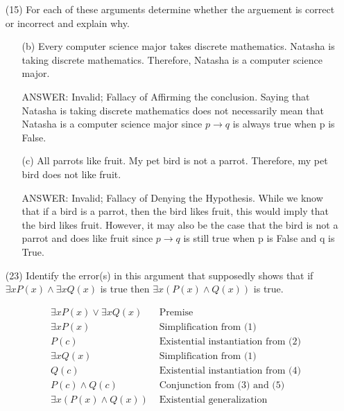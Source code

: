 \documentclass[12pt]{article}
\newcommand\buf{\vspace{0.10in}}
\newenvironment{answer}{\fontfamily{ptm}\selectfont \smaller[1] ANSWER: }{}
\begin{document}
\begin{enumerate}
\vspace{0.20in}



\item[(15)] For each of these arguments determine whether the arguement is correct or incorrect and explain why.
\buf

\begin{enumerate}
	\item[(b)] Every computer science major takes discrete mathematics. Natasha is taking discrete mathematics. Therefore, Natasha is a computer science major.
	
	\begin{answer}
		Invalid; Fallacy of Affirming the conclusion. Saying that Natasha is taking discrete mathematics does not necessarily mean that Natasha is a computer science major since $p \to q$ is always true when p is False.
	\end{answer}

	\item[(c)] All parrots like fruit. My pet bird is not a parrot. Therefore, my pet bird does not like fruit.
	
	\begin{answer}
		Invalid; Fallacy of Denying the Hypothesis. While we know that if a bird is a parrot, then the bird likes fruit, this would imply that the bird likes fruit. However, it may also be the case that the bird is not a parrot and does like fruit since $p \to q$ is still true when p is False and q is True.
	\end{answer}
\end{enumerate}

\vspace{0.20in}

\item[(23)] Identify the error(s) in this argument that supposedly shows that if $\exists x P(x) \wedge \exists x Q(x)$ is true then $\exists x (P(x) \wedge Q(x))$ is true.

\begin{align}
	&\exists x P(x) \vee \exists x Q(x) &\text{ Premise}\\
	&\exists x P(x) &\text{ Simplification from (1)}\\
	&P(c) &\text{ Existential instantiation from (2)}\\
	&\exists x Q(x) &\text{ Simplification from (1)}\\
	&Q(c) &\text{ Existential instantiation from (4)}\\
	&P(c) \wedge Q(c) &\text{ Conjunction from (3) and (5)}\\
	&\exists x (P(x) \wedge Q(x)) &\text{ Existential generalization}\\
\end{align}


\end{enumerate}
\end{document}
